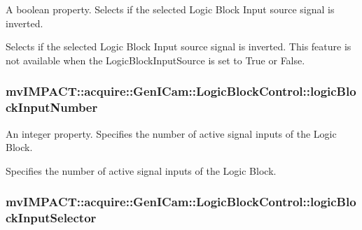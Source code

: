 A boolean property. Selects if the selected Logic Block Input source signal is inverted. 

Selects if the selected Logic Block Input source signal is inverted. This feature is not available when the Logic\+Block\+Input\+Source is set to True or False. \hypertarget{classmv_i_m_p_a_c_t_1_1acquire_1_1_gen_i_cam_1_1_logic_block_control_aaf6dce626150725cd30dd0174a515abb}{
\subsubsection[{logic\+Block\+Input\+Number}]{ mv\+I\+M\+P\+A\+C\+T\+::acquire\+::\+Gen\+I\+Cam\+::\+Logic\+Block\+Control\+::logic\+Block\+Input\+Number}}\label{classmv_i_m_p_a_c_t_1_1acquire_1_1_gen_i_cam_1_1_logic_block_control_aaf6dce626150725cd30dd0174a515abb}


An integer property. Specifies the number of active signal inputs of the Logic Block. 

Specifies the number of active signal inputs of the Logic Block. \hypertarget{classmv_i_m_p_a_c_t_1_1acquire_1_1_gen_i_cam_1_1_logic_block_control_a0ead89ee91cbaf6afcd068ba5f96caa5}{
\subsubsection[{logic\+Block\+Input\+Selector}]{ mv\+I\+M\+P\+A\+C\+T\+::acquire\+::\+Gen\+I\+Cam\+::\+Logic\+Block\+Control\+::logic\+Block\+Input\+Selector}}\label{classmv_i_m_p_a_c_t_1_1acquire_1_1_gen_i_cam_1_1_logic_block_control_a0ead89ee91cbaf6afcd068ba5f96caa5}


